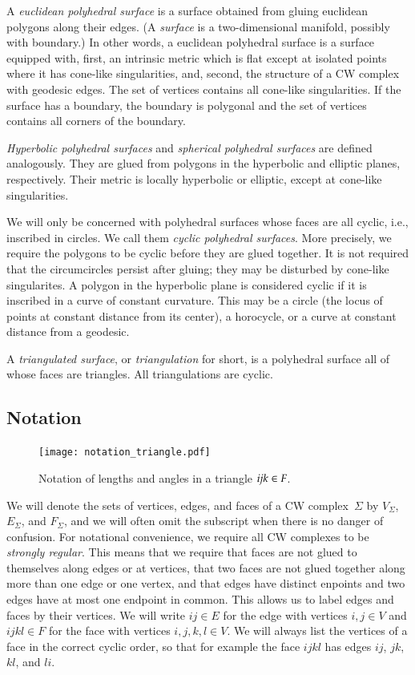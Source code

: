 \documentclass[Thesis]{subfiles}
\begin{document}
A \emph{euclidean polyhedral surface} is a surface obtained from
gluing euclidean polygons along their edges. (A \emph{surface} is a
two-dimensional manifold, possibly with boundary.)  In other words, a
euclidean polyhedral surface is a surface equipped with, first, an
intrinsic metric which is flat except at isolated points where it has
cone-like singularities, and, second, the structure of a CW complex
with geodesic edges. The set of vertices contains all cone-like
singularities. If the surface has a boundary, the boundary is
polygonal and the set of vertices contains all corners of the
boundary.

\emph{Hyperbolic polyhedral surfaces} and \emph{spherical polyhedral
surfaces} are defined analogously. They are glued from polygons in
the hyperbolic and elliptic planes, respectively. Their metric is
locally hyperbolic or elliptic, except at cone-like singularities.

We will only be concerned with polyhedral surfaces whose faces are all
cyclic, i.e., inscribed in circles. We call them \emph{cyclic
polyhedral surfaces}. More precisely, we require the polygons to be
cyclic before they are glued together. It is not required that the
circumcircles persist after gluing; they may be disturbed by cone-like
singularites. A polygon in the hyperbolic plane is considered cyclic
if it is inscribed in a curve of constant curvature. This may be a
circle (the locus of points at constant distance from its center), a
horocycle, or a curve at constant distance from a geodesic.

A \emph{triangulated surface}, or \emph{triangulation} for short, is a
polyhedral surface all of whose faces are triangles.  All
triangulations are cyclic.

\subsection{Notation}

\begin{figure}
\centering
\texttt{[image: notation\_triangle.pdf]}
\caption{Notation of lengths and angles in a triangle $\it ijk \in F$.}
\label{fig:triangle_notation}	
\end{figure}

We will denote the sets of vertices, edges, and faces of a CW
complex~$\Sigma$ by $V_{\Sigma}$, $E_{\Sigma}$, and $F_{\Sigma}$, and
we will often omit the subscript when there is no danger of confusion.
For notational convenience, we require all CW complexes to be
\emph{strongly regular}. This means that we require that faces are not
glued to themselves along edges or at vertices, that two faces are not
glued together along more than one edge or one vertex, and that edges
have distinct enpoints and two edges have at most one endpoint in
common. This allows us to label edges and faces by their vertices. We
will write $\mathit{ij}\in E$ for the edge with vertices $i,j\in V$ and
$\mathit{ijkl}\in F$ for the face with vertices $i,j,k,l\in V$. We will always
list the vertices of a face in the correct cyclic order, so that for
example the face $\mathit{ijkl}$ has edges $\mathit{ij}$, $\mathit{jk}$,
$\mathit{kl}$, and $\mathit{li}$.
\end{document}
